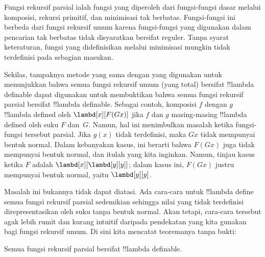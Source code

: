 \documentclass[../../../include/open-logic-section]{subfiles}
\begin{document}

Fungsi rekursif parsial ialah fungsi yang diperoleh dari fungsi-fungsi dasar
melalui komposisi, rekursi primitif, dan minimisasi tak berbatas.
Fungsi-fungsi ini berbeda dari fungsi rekursif umum karena fungsi-fungsi
yang digunakan dalam pencarian tak berbatas tidak disyaratkan bersifat
reguler. Tanpa syarat
keteraturan, fungsi yang didefinisikan melalui minimisasi mungkin tidak
terdefinisi pada sebagian masukan.

Sekilas, tampaknya metode yang sama dengan yang digunakan untuk menunjukkan
bahwa semua fungsi rekursif umum (yang total) bersifat !!{lambda definable}
dapat digunakan untuk membuktikan bahwa semua fungsi rekursif parsial bersifat
!!{lambda definable}. Sebagai contoh, komposisi $f$ dengan $g$
!!{lambda defined} oleh $\lambd[x][F (G x)]$ jika $f$ dan $g$ masing-masing
!!{lambda defined} oleh suku $F$ dan~$G$. Namun, hal ini menimbulkan masalah
ketika fungsi-fungsi tersebut parsial. Jika $g(x)$ tidak terdefinisi, maka
$G x$ tidak mempunyai bentuk normal. Dalam kebanyakan kasus, ini berarti
bahwa $F (G x)$ juga tidak mempunyai bentuk normal, dan itulah yang kita
inginkan. Namun, tinjau kasus ketika $F$ adalah
$\lambd[x][\lambd[y][y]]$; dalam kasus ini, $F (G x)$ justru mempunyai bentuk
normal, yaitu $\lambd[y][y]$.

Masalah ini bukannya tidak dapat diatasi. Ada cara-cara untuk
!!{lambda define} semua fungsi rekursif parsial sedemikian sehingga nilai yang
tidak terdefinisi direpresentasikan oleh suku tanpa bentuk normal. Akan tetapi,
cara-cara tersebut agak lebih rumit dan kurang intuitif daripada pendekatan
yang kita gunakan bagi fungsi rekursif umum. Di sini kita mencatat teoremanya
tanpa bukti:

\begin{thm}
  Semua fungsi rekursif parsial bersifat !!{lambda definable}.
\end{thm}
\end{document}
